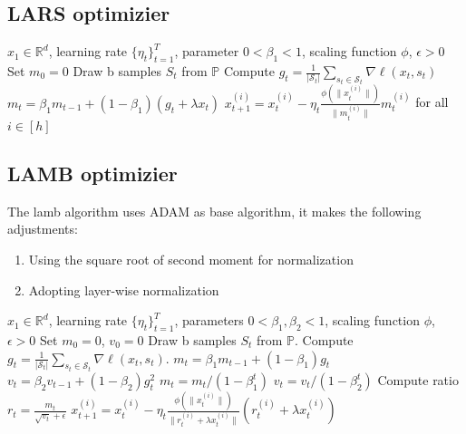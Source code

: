 \subsection*{LARS optimizier}

\begin{minipage}[b]{.48\textwidth}
\begin{algorithm}[H]\small
	\caption{$LARS$}
	\label{alg:lars}
	\begin{algorithmic}
		 $x_1 \in \mathbb{R}^d$, learning rate $\{\eta_t\}_{t=1}^T$, parameter $0 < \beta_{1} < 1$, scaling function $\phi$, $\epsilon > 0$
		\STATE Set $m_{0} = 0$
		\STATE Draw b samples $S_t$ from $\mathbb{P}$
        \STATE Compute $g_t = \frac{1}{|\mathcal{S}_t|} \sum_{s_t \in \mathcal{S}_t}\nabla \ell(x_t, s_t)$
        \STATE $m_{t} = \beta_{1} m_{t-1} + (1 - \beta_{1}) (g_{t} + \lambda x_t)$
		\STATE $x_{t+1}^{(i)} = x_{t}^{(i)} - \eta_t \frac{\phi(\|x_t^{(i)}\|)}{\|m_t^{(i)}\|} m_t^{(i)}$ for all $i \in [h]$
		\ENDFOR
	\end{algorithmic}
\end{algorithm}
\end{minipage}\hfill%

\subsection*{LAMB optimizier}
The lamb algorithm uses ADAM as base algorithm, it makes the following adjustments:
\begin{enumerate}
    \item Using the square root of second moment for normalization
    \item Adopting layer-wise normalization
\end{enumerate}
\begin{minipage}[b]{.5\textwidth}
\begin{algorithm}[H]\small
	\caption{$LAMB$}
	\label{alg:lamb}
	\begin{algorithmic}
		 $x_1 \in \mathbb{R}^d$, learning rate $\{\eta_t\}_{t=1}^T$,  parameters $0 < \beta_{1}, \beta_2 < 1$, scaling function $\phi$, $\epsilon > 0$
		\STATE Set $m_{0} = 0$, $v_{0} = 0$
		\FOR{$t=1$ {\bf to} $T$}
		\STATE Draw b samples $S_t$ from $\mathbb{P}$.
        \STATE Compute $g_t = \frac{1}{|\mathcal{S}_t|} \sum_{s_t \in \mathcal{S}_t}\nabla \ell(x_t, s_t)$.
		\STATE  $m_{t} = \beta_{1} m_{t-1} + (1 - \beta_{1}) g_{t}$ 
		\STATE  $v_{t} = \beta_{2} v_{t-1} + (1 - \beta_{2}) g_{t}^2$
		\STATE $m_t = m_t/(1 - {\beta}_1^t)$ 
        \STATE $v_t = v_t/(1 - {\beta}_2^t)$
		\STATE Compute ratio $r_t = \frac{m_t}{\sqrt{v_t} + \epsilon}$
		\STATE $x_{t+1}^{(i)} = x_{t}^{(i)} - \eta_t \frac{\phi(\|x_t^{(i)}\|)}{\|r_t^{(i)} + \lambda x_t^{(i)}\|} (r_t^{(i)} + \lambda x_t^{(i)})$
		\ENDFOR
	\end{algorithmic}
\end{algorithm}
\end{minipage}